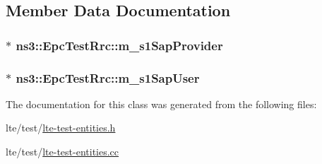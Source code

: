 \subsection{Member Data Documentation}
\subsubsection[{\texorpdfstring{m\+\_\+s1\+Sap\+Provider}{m_s1SapProvider}}]{$\ast$ ns3\+::\+Epc\+Test\+Rrc\+::m\+\_\+s1\+Sap\+Provider\hspace{0.3cm}{\ttfamily [private]}}\hypertarget{classns3_1_1EpcTestRrc_aae04ef2c88c257a8dcf3555cd8f47ba3}{}\label{classns3_1_1EpcTestRrc_aae04ef2c88c257a8dcf3555cd8f47ba3}
\subsubsection[{\texorpdfstring{m\+\_\+s1\+Sap\+User}{m_s1SapUser}}]{$\ast$ ns3\+::\+Epc\+Test\+Rrc\+::m\+\_\+s1\+Sap\+User\hspace{0.3cm}{\ttfamily [private]}}\hypertarget{classns3_1_1EpcTestRrc_a00ff3faa8077cb08667d55f4f4b42a20}{}\label{classns3_1_1EpcTestRrc_a00ff3faa8077cb08667d55f4f4b42a20}


The documentation for this class was generated from the following files\+:\begin{DoxyCompactItemize}
\item 
lte/test/\hyperlink{lte-test-entities_8h}{lte-\/test-\/entities.\+h}\item 
lte/test/\hyperlink{lte-test-entities_8cc}{lte-\/test-\/entities.\+cc}\end{DoxyCompactItemize}
